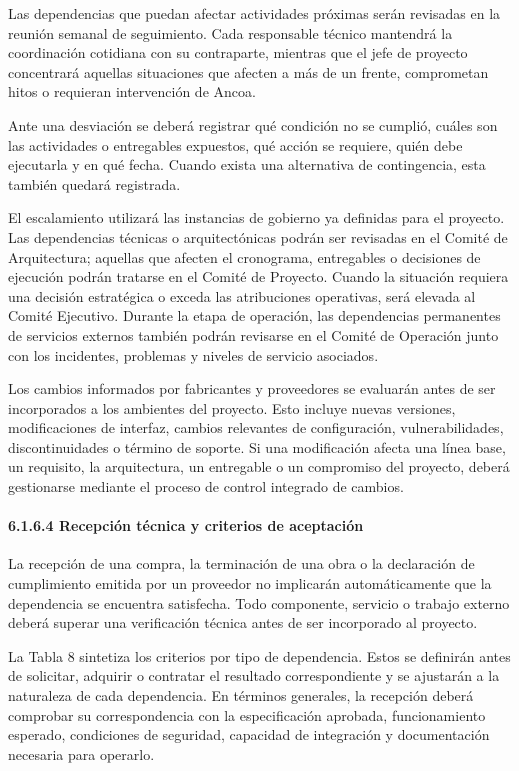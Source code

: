 \documentclass[11pt]{article}
\begin{document}
Las dependencias que puedan afectar actividades próximas serán revisadas
en la reunión semanal de seguimiento. Cada responsable técnico mantendrá
la coordinación cotidiana con su contraparte, mientras que el jefe de
proyecto concentrará aquellas situaciones que afecten a más de un
frente, comprometan hitos o requieran intervención de Ancoa.

Ante una desviación se deberá registrar qué condición no se cumplió,
cuáles son las actividades o entregables expuestos, qué acción se
requiere, quién debe ejecutarla y en qué fecha. Cuando exista una
alternativa de contingencia, esta también quedará registrada.

El escalamiento utilizará las instancias de gobierno ya definidas para
el proyecto. Las dependencias técnicas o arquitectónicas podrán ser
revisadas en el Comité de Arquitectura; aquellas que afecten el
cronograma, entregables o decisiones de ejecución podrán tratarse en el
Comité de Proyecto. Cuando la situación requiera una decisión
estratégica o exceda las atribuciones operativas, será elevada al Comité
Ejecutivo. Durante la etapa de operación, las dependencias permanentes
de servicios externos también podrán revisarse en el Comité de Operación
junto con los incidentes, problemas y niveles de servicio asociados.

Los cambios informados por fabricantes y proveedores se evaluarán antes
de ser incorporados a los ambientes del proyecto. Esto incluye nuevas
versiones, modificaciones de interfaz, cambios relevantes de
configuración, vulnerabilidades, discontinuidades o término de soporte.
Si una modificación afecta una línea base, un requisito, la
arquitectura, un entregable o un compromiso del proyecto, deberá
gestionarse mediante el proceso de control integrado de cambios.

\paragraph{6.1.6.4 Recepción técnica y criterios de aceptación}\label{6-1-6-4-recepcion-tecnica-y-criterios-de-aceptacion}

La recepción de una compra, la terminación de una obra o la declaración de cumplimiento emitida por un proveedor no implicarán automáticamente que la dependencia se encuentra satisfecha. Todo componente, servicio o trabajo externo deberá superar una verificación técnica antes de ser incorporado al proyecto.

La Tabla 8 sintetiza los criterios por tipo de dependencia. Estos se
definirán antes de solicitar, adquirir o contratar el resultado
correspondiente y se ajustarán a la naturaleza de cada dependencia. En
términos generales, la recepción deberá comprobar su correspondencia con
la especificación aprobada, funcionamiento esperado, condiciones de
seguridad, capacidad de integración y documentación necesaria para
operarlo.
\end{document}
